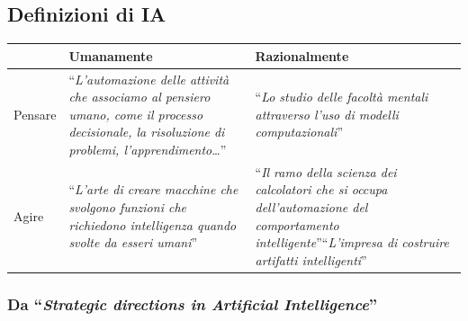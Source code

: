 \subsection{Definizioni di IA}
\begin{table}[H]
	\centering
	\begin{tabular}{|l|p{13.5em}|p{13em}|}
		\hline
		        & Umanamente                                                                                                                                                                      & Razionalmente                                                                                                                                                                                                                                  \\\hline
		Pensare & ``\textit{L'automazione delle attività che associamo al pensiero umano, come il processo decisionale, la risoluzione di problemi, l'apprendimento}\dots''\newline[Bellman 1978] & ``\textit{Lo studio delle facoltà mentali attraverso l'uso di modelli computazionali}''\newline[Charniak, McDermott, 1985]                                                                                                                     \\\hline
		Agire   & ``\textit{L'arte di creare macchine che svolgono funzioni che richiedono intelligenza quando svolte da esseri umani}''\newline[Kurzweil 1990]                                   & ``\textit{Il ramo della scienza dei calcolatori che si occupa dell'automazione del comportamento intelligente}''\newline [Luger-Stubblefield 1993] \newline ``\textit{L'impresa di costruire artifatti intelligenti}''\newline [Ginsberg 1993] \\\hline
	\end{tabular}
\end{table}
\subsubsection{Da ``\textit{Strategic directions in Artificial Intelligence}''}

